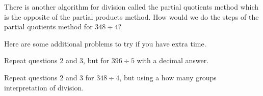 \documentclass[nooutcomes,noauthor, handout]{ximera}
\begin{document}
\begin{problem}
There is another algorithm for division called the partial quotients method which is the opposite of the partial products method. How would we do the steps of the partial quotients method for $348 \div 4$?
\end{problem}

\newpage

Here are some additional problems to try if you have extra time.


\begin{problem}
Repeat questions 2 and 3, but for $396 \div 5$ with a decimal answer.
\end{problem}


\begin{problem}
Repeat questions 2 and 3 for $348 \div 4$, but using a how many groups interpretation of division.
\end{problem}




\newpage
\end{document}

